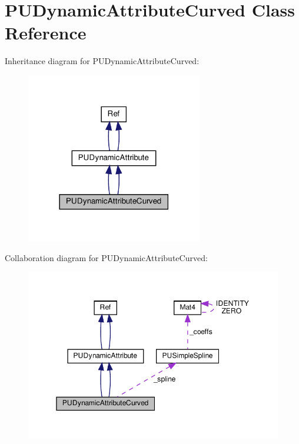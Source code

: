 \hypertarget{classPUDynamicAttributeCurved}{}\section{P\+U\+Dynamic\+Attribute\+Curved Class Reference}
\label{classPUDynamicAttributeCurved}


Inheritance diagram for P\+U\+Dynamic\+Attribute\+Curved\+:
\nopagebreak
\begin{figure}[H]
\begin{center}
\leavevmode
\includegraphics[width=218pt]{classPUDynamicAttributeCurved__inherit__graph}
\end{center}
\end{figure}


Collaboration diagram for P\+U\+Dynamic\+Attribute\+Curved\+:
\nopagebreak
\begin{figure}[H]
\begin{center}
\leavevmode
\includegraphics[width=350pt]{classPUDynamicAttributeCurved__coll__graph}
\end{center}
\end{figure}

